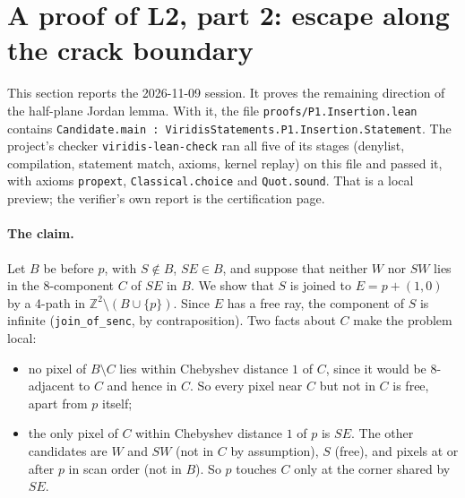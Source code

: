 \documentclass[11pt]{article}
\theoremstyle{definition}
\theoremstyle{remark}
\begin{document}
\section{A proof of L2, part 2: escape along the crack boundary}\label{sec:crack}

This section reports the 2026-11-09 session. It proves the remaining direction of the
half-plane Jordan lemma. With it, the file \texttt{proofs/P1.Insertion.lean} contains
\texttt{Candidate.main : ViridisStatements.P1.Insertion.Statement}. The project's
checker \texttt{viridis-lean-check} ran all five of its stages (denylist, compilation,
statement match, axioms, kernel replay) on this file and passed it, with axioms
\texttt{propext}, \texttt{Classical.choice} and \texttt{Quot.sound}. That is a local
preview; the verifier's own report is the certification page.

\paragraph{The claim.} Let $B$ be before $p$, with $S\notin B$, $SE\in B$, and suppose that
neither $W$ nor $SW$ lies in the 8-component $C$ of $SE$ in $B$. We show that $S$ is joined to
$E=p+(1,0)$ by a 4-path in $\mathbb{Z}^2\setminus(B\cup\{p\})$. Since $E$ has a free
ray, the component of $S$ is infinite (\texttt{join\_of\_senc}, by contraposition). Two
facts about $C$ make the problem local:
\begin{itemize}
\item no pixel of $B\setminus C$ lies within Chebyshev distance $1$ of $C$, since it
  would be 8-adjacent to $C$ and hence in $C$. So every pixel near $C$ but not in $C$ is free,
  apart from $p$ itself;
\item the only pixel of $C$ within Chebyshev distance $1$ of $p$ is $SE$. The other
  candidates are $W$ and $SW$ (not in $C$ by assumption), $S$ (free), and pixels at or
  after $p$ in scan order (not in $B$). So $p$ touches $C$ only at the corner shared by $SE$.
\end{itemize}
\end{document}
